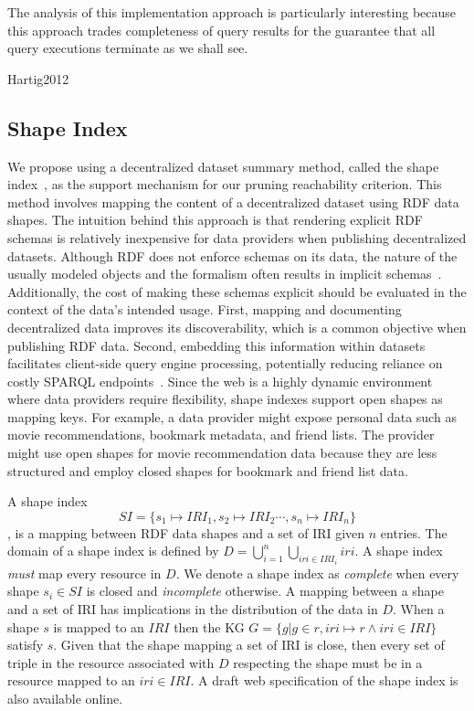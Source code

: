 The analysis
of this implementation approach is particularly interesting because
this approach trades completeness of query results for the guarantee
that all query executions terminate as we shall see.


Hartig2012
\fi


\subsection{Shape Index}

We propose using a decentralized dataset summary method, called the shape index~\cite{tam2024opportunitiesshapebasedoptimizationlink}, as the support mechanism for our pruning reachability criterion.
This method involves mapping the content of a decentralized dataset using RDF data shapes.
The intuition behind this approach is that rendering explicit RDF schemas is relatively inexpensive for data providers when publishing decentralized datasets.
Although RDF does not enforce schemas on its data, the nature of the usually modeled objects and the formalism often results in implicit schemas~\cite{Neumann2011CharacteristicSA}.
Additionally, the cost of making these schemas explicit should be evaluated in the context of the data's intended usage.
First, mapping and documenting decentralized data improves its discoverability, which is a common objective when publishing RDF data.
Second, embedding this information within datasets facilitates client-side query engine processing, potentially reducing reliance on costly SPARQL endpoints~\cite{aranda2013}.
Since the web is a highly dynamic environment where data providers require flexibility, shape indexes support open shapes as mapping keys.
For example, a data provider might expose personal data such as movie recommendations, bookmark metadata, and friend lists.
The provider might use open shapes for movie recommendation data because they are less structured and employ closed shapes for bookmark and friend list data.

A shape index 
\begin{equation}\label{eq:shapeIndex}
   SI = \{s_1 \mapsto IRI_1, s_2 \mapsto IRI_2 \cdots, s_n \mapsto IRI_n\}
\end{equation}
, is a mapping between RDF data shapes and a set of IRI given $n$ entries.
The domain of a shape index is defined by $D = \bigcup_{i=1}^{n} \bigcup_{iri \in IRI_i} iri$.
A shape index \emph{must} map every resource in $D$.
We denote a shape index as \emph{complete} when every shape $s_i \in SI$ is closed and \emph{incomplete} otherwise.
A mapping between a shape and a set of IRI has implications in the distribution of the data in $D$.
When a shape $s$ is mapped to an $IRI$ then the KG $G = \{g | g \in r, iri \mapsto r \land iri \in IRI\}$ satisfy $s$.
Given that the shape mapping a set of IRI is close, then every set of triple in the resource associated with $D$ respecting the shape must be in a resource mapped to an $iri \in IRI$.
A draft web specification of the shape index is also available online.~

